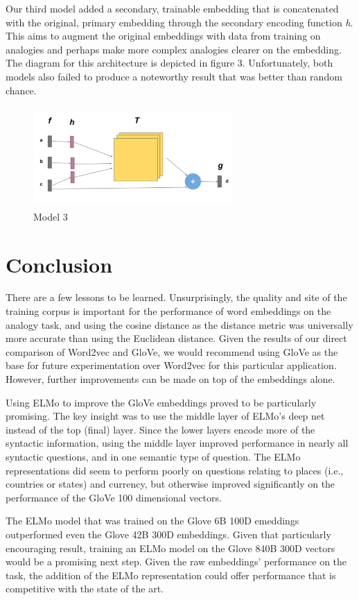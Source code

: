 \documentclass[11pt]{article}
\begin{document}
Our third model added a secondary, trainable embedding that is
concatenated with the original, primary embedding through the secondary
encoding function \emph{h}. This aims to augment the original embeddings
with data from training on analogies and perhaps make more complex
analogies clearer on the embedding. The diagram for this architecture is
depicted in figure 3. Unfortunately, both models also failed to produce
a noteworthy result that was better than random chance.

\begin{figure}
  \centering
\includegraphics[width=3.0in,height=1.5in]{./model_3.png}
  \caption{Model 3}
\end{figure}

\section{Conclusion}

There are a few lessons to be learned. Unsurprisingly, the quality and site of
the training corpus is important for the performance of word embeddings on the
analogy task, and using the cosine distance as the distance metric was
universally more accurate than using the Euclidean distance. Given the results
of our direct comparison of Word2vec and GloVe, we would recommend using GloVe
as the base for future experimentation over Word2vec for this particular
application. However, further improvements can be made on top of the embeddings
alone.

Using ELMo to improve the GloVe embeddings proved to be particularly promising.
The key insight was to use the middle layer of ELMo's deep net instead of the
top (final) layer. Since the lower layers encode more of the syntactic
information, using the middle layer improved performance in nearly all syntactic
questions, and in one semantic type of question. The ELMo representations did
seem to perform poorly on questions relating to places (i.e., countries or
states) and currency, but otherwise improved significantly on the performance of the GloVe
100 dimensional vectors.

The ELMo model that was trained on the Glove 6B 100D emeddings
outperformed even the Glove 42B 300D embeddings. Given that particularly
encouraging result, training an ELMo model on the Glove 840B 300D
vectors would be a promising next step. Given the raw embeddings'
performance on the task, the addition of the ELMo representation could
offer performance that is competitive with the state of the art.
\end{document}
